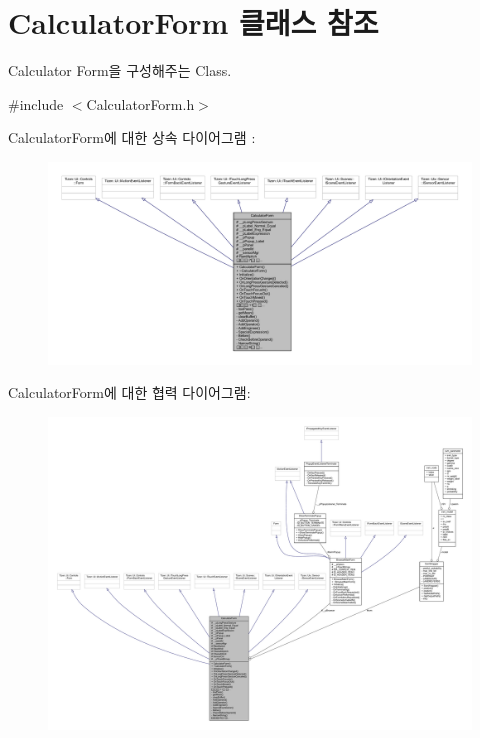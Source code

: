 \hypertarget{class_calculator_form}{\section{Calculator\+Form 클래스 참조}
\label{class_calculator_form}
}


Calculator Form을 구성해주는 Class.  




{\ttfamily \#include $<$Calculator\+Form.\+h$>$}



Calculator\+Form에 대한 상속 다이어그램 \+: 
\nopagebreak
\begin{figure}[H]
\begin{center}
\leavevmode
\includegraphics[width=350pt]{class_calculator_form__inherit__graph}
\end{center}
\end{figure}


Calculator\+Form에 대한 협력 다이어그램\+:
\nopagebreak
\begin{figure}[H]
\begin{center}
\leavevmode
\includegraphics[width=350pt]{class_calculator_form__coll__graph}
\end{center}
\end{figure}
